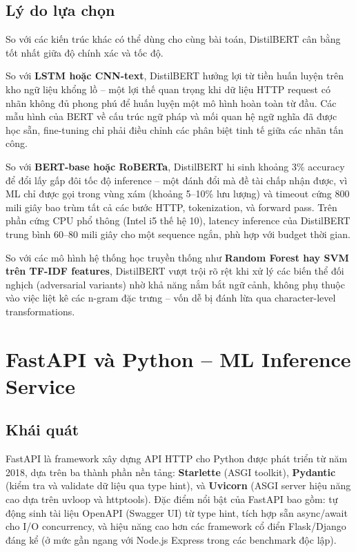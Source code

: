 \documentclass[../DoAn.tex]{subfiles}
\begin{document}
\subsection{Lý do lựa chọn}
\label{subsection:3.3.3}

So với các kiến trúc khác có thể dùng cho cùng bài toán, DistilBERT cân
bằng tốt nhất giữa độ chính xác và tốc độ.

So với \textbf{LSTM hoặc CNN-text}, DistilBERT hưởng lợi từ tiền huấn luyện
trên kho ngữ liệu khổng lồ -- một lợi thế quan trọng khi dữ liệu HTTP request
có nhãn không đủ phong phú để huấn luyện một mô hình hoàn toàn từ đầu. Các
mẫu hình của BERT về cấu trúc ngữ pháp và mối quan hệ ngữ nghĩa đã được
học sẵn, fine-tuning chỉ phải điều chỉnh các phân biệt tinh tế giữa các
nhãn tấn công.

So với \textbf{BERT-base hoặc RoBERTa}, DistilBERT hi sinh khoảng 3\% accuracy
để đổi lấy gấp đôi tốc độ inference -- một đánh đổi mà đề tài chấp nhận
được, vì ML chỉ được gọi trong vùng xám (khoảng 5--10\% lưu lượng) và
timeout cứng 800 mili giây bao trùm tất cả các bước HTTP, tokenization, và
forward pass. Trên phần cứng CPU phổ thông (Intel i5 thế hệ 10), latency
inference của DistilBERT trung bình 60--80 mili giây cho một sequence ngắn,
phù hợp với budget thời gian.

So với các mô hình hệ thống học truyền thống như \textbf{Random Forest hay
SVM trên TF-IDF features}, DistilBERT vượt trội rõ rệt khi xử lý các biến
thể đối nghịch (adversarial variants) nhờ khả năng nắm bắt ngữ cảnh, không
phụ thuộc vào việc liệt kê các n-gram đặc trưng -- vốn dễ bị đánh lừa qua
character-level transformations.

\section{FastAPI và Python -- ML Inference Service}
\label{section:3.4}

\subsection{Khái quát}
\label{subsection:3.4.1}

FastAPI là framework xây dựng API HTTP cho Python được phát triển từ năm
2018, dựa trên ba thành phần nền tảng: \textbf{Starlette} (ASGI toolkit),
\textbf{Pydantic} (kiểm tra và validate dữ liệu qua type hint), và
\textbf{Uvicorn} (ASGI server hiệu năng cao dựa trên uvloop và httptools).
Đặc điểm nổi bật của FastAPI bao gồm: tự động sinh tài liệu OpenAPI (Swagger
UI) từ type hint, tích hợp sẵn async/await cho I/O concurrency, và hiệu
năng cao hơn các framework cổ điển Flask/Django đáng kể (ở mức gần ngang
với Node.js Express trong các benchmark độc lập).
\end{document}
